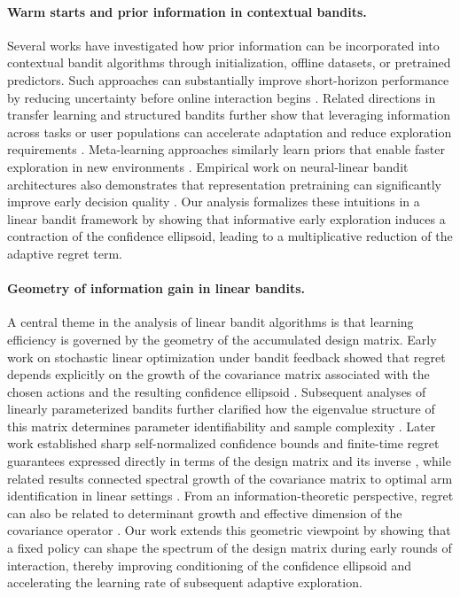 \documentclass{article}
\theoremstyle{definition}
\theoremstyle{remark}
\theoremstyle{remark}
\begin{document}
\paragraph{Warm starts and prior information in contextual bandits.}
Several works have investigated how prior information can be incorporated
into contextual bandit algorithms through initialization, offline datasets,
or pretrained predictors. Such approaches can substantially improve
short-horizon performance by reducing uncertainty before online interaction
begins \cite{bastani2021mostly,zhang2019warm}. Related directions in
transfer learning and structured bandits further show that leveraging
information across tasks or user populations can accelerate adaptation and
reduce exploration requirements \cite{lazaric2012transfer,gentile2014online}.
Meta-learning approaches similarly learn priors that enable faster
exploration in new environments \cite{sharaf2019meta}. Empirical work on
neural-linear bandit architectures also demonstrates that representation
pretraining can significantly improve early decision quality
\cite{riquelme2018deep}. Our analysis formalizes these intuitions in a
linear bandit framework by showing that informative early exploration
induces a contraction of the confidence ellipsoid, leading to a
multiplicative reduction of the adaptive regret term.

\paragraph{Geometry of information gain in linear bandits.}
A central theme in the analysis of linear bandit algorithms is that learning
efficiency is governed by the geometry of the accumulated design matrix.
Early work on stochastic linear optimization under bandit feedback showed
that regret depends explicitly on the growth of the covariance matrix
associated with the chosen actions and the resulting confidence ellipsoid
\cite{dani2008stochastic}. Subsequent analyses of linearly parameterized
bandits further clarified how the eigenvalue structure of this matrix
determines parameter identifiability and sample complexity
\cite{rusmevichientong2010linearly}. Later work established sharp
self-normalized confidence bounds and finite-time regret guarantees
expressed directly in terms of the design matrix and its inverse
\cite{abbasi2011improved}, while related results connected spectral growth
of the covariance matrix to optimal arm identification in linear settings
\cite{soare2014best}. From an information-theoretic perspective, regret can
also be related to determinant growth and effective dimension of the
covariance operator \cite{srinivas2012information,valko2013finite}. Our
work extends this geometric viewpoint by showing that a fixed policy can
shape the spectrum of the design matrix during early rounds of interaction,
thereby improving conditioning of the confidence ellipsoid and accelerating
the learning rate of subsequent adaptive exploration.
\end{document}
